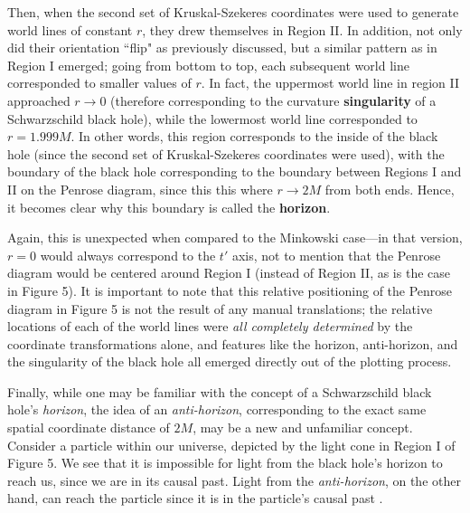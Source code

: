 \documentclass{article}
\begin{document}
Then, when the second set of Kruskal-Szekeres coordinates were used to generate world lines of constant $r$, they drew themselves in Region II. In addition, not only did their orientation ``flip" as previously discussed, but a similar pattern as in Region I emerged; going from bottom to top, each subsequent world line corresponded to smaller values of $r$. In fact, the uppermost world line in region II approached $r\rightarrow0$ (therefore corresponding to the curvature \textbf{singularity} of a Schwarzschild black hole), while the lowermost world line corresponded to $r=1.999M$. In other words, this region corresponds to the inside of the black hole (since the second set of Kruskal-Szekeres coordinates were used), with the boundary of the black hole corresponding to the boundary between Regions I and II on the Penrose diagram, since this this where $r\rightarrow2M$ from both ends. Hence, it becomes clear why this boundary is called the \textbf{horizon}.

Again, this is unexpected when compared to the Minkowski case---in that version, $r=0$ would always correspond to the $t'$ axis, not to mention that the Penrose diagram would be centered around Region I (instead of Region II, as is the case in Figure 5). It is important to note that this relative positioning of the Penrose diagram in Figure 5 is not the result of any manual translations; the relative locations of each of the world lines were \textit{all completely determined} by the coordinate transformations alone, and features like the horizon, anti-horizon, and the singularity of the black hole all emerged directly out of the plotting process.

Finally, while one may be familiar with the concept of a Schwarzschild black hole's \textit{horizon}, the idea of an \textit{anti-horizon}, corresponding to the exact same spatial coordinate distance of $2M$, may be a new and unfamiliar concept. Consider a particle within our universe, depicted by the light cone in Region I of Figure 5. We see that it is impossible for light from the black hole's horizon to reach us, since we are in its causal past. Light from the \textit{anti-horizon}, on the other hand, can reach the particle since it is in the particle's causal past \cite{anti_horizon}.
\end{document}
